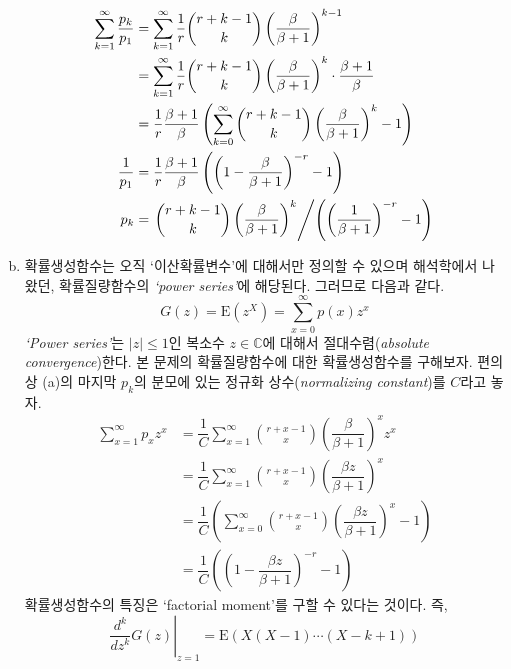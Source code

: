 \documentclass[answers]{exam}
\begin{document}
\begin{questions}
\begin{solution}
\begin{enumerate}[(a)]
      \begin{align}
        \sum_{k=1}^{\infty}\dfrac{p_{k}}{p_{1}} &= \sum_{k=1}^{\infty}\dfrac{1}{r}{{r+k-1}\choose{k}}\left(\dfrac{\beta}{\beta+1}\right)^{k-1}\\
        &= \sum_{k=1}^{\infty}\dfrac{1}{r}{{r+k-1}\choose{k}}\left(\dfrac{\beta}{\beta+1}\right)^{k}\cdot \dfrac{\beta+1}{\beta}\\
        &= \dfrac{1}{r}\dfrac{\beta+1}{\beta}\left(\sum_{k=0}^{\infty}{{r+k-1}\choose{k}}\left(\dfrac{\beta}{\beta+1}\right)^{k} -1\right)\\
        \dfrac{1}{p_{1}}&= \dfrac{1}{r}\dfrac{\beta+1}{\beta}\left(\left(1-\dfrac{\beta}{\beta+1}\right)^{-r}-1\right)\\
        p_{k} &= \left.{{r+k-1}\choose{k}}\left(\dfrac{\beta}{\beta+1}\right)^{k}\middle/ \left(\left(\dfrac{1}{\beta+1}\right)^{-r}-1\right)\right.
      \end{align}
      \item 확률생성함수는 오직 `이산확률변수'에 대해서만 정의할 수 있으며 해석학에서 나왔던, 확률질량함수의 \emph{`power series'}에 해당된다. 그러므로 다음과 같다.
      \begin{equation}
        G\left(z\right) = \mathrm{E}\left(z^{X}\right)=\sum_{x=0}^{\infty}p\left(x\right)z^{x}
      \end{equation}
      \emph{`Power series'}는 $\left|z\right|\leq1$인 복소수 $z\in\mathbb{C}$에 대해서 절대수렴(\emph{absolute convergence})한다. 본 문제의 확률질량함수에 대한 확률생성함수를 구해보자. 편의상 (a)의 마지막 $p_{k}$의 분모에 있는 정규화 상수(\emph{normalizing constant})를 $C$라고 놓자.
      \begin{align}
        \sum_{x=1}^{\infty}p_{x}z^{x} &= \dfrac{1}{C}\sum_{x=1}^{\infty}{{r+x-1}\choose{x}}\left(\dfrac{\beta}{\beta+1}\right)^{x}z^{x}\\
        &=\dfrac{1}{C}\sum_{x=1}^{\infty}{{r+x-1}\choose{x}}\left(\dfrac{\beta z}{\beta+1}\right)^{x}\\
        &= \dfrac{1}{C}\left(\sum_{x=0}^{\infty}{{r+x-1}\choose{x}}\left(\dfrac{\beta z}{\beta+1}\right)^{x}-1\right)\\
        &= \dfrac{1}{C}\left(\left(1-\dfrac{\beta z}{\beta+1}\right)^{-r}-1\right)
      \end{align}
      확률생성함수의 특징은 `factorial moment'를 구할 수 있다는 것이다. 즉,
      \begin{equation}
        \left.\dfrac{d^{k}}{dz^{k}}G\left(z\right)\right|_{z=1} = \mathrm{E}\left(X\left(X-1\right)\cdots\left(X-k+1\right)\right)

\end{equation}
\end{enumerate}
\end{solution}
\end{questions}
\end{document}
